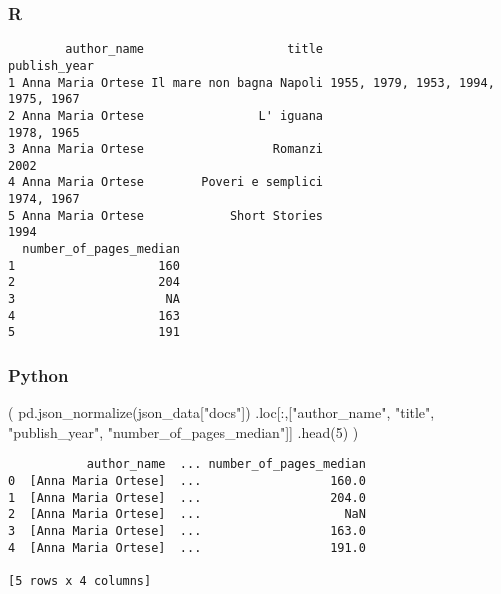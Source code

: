 \documentclass[
  letterpaper,
  DIV=11,
  numbers=noendperiod]{scrreprt}
\newenvironment{Shaded}{\begin{snugshade}}{\end{snugshade}}
\newcommand{\DecValTok}[1]{\textcolor[rgb]{0.68,0.00,0.00}{#1}}
\newcommand{\FunctionTok}[1]{\textcolor[rgb]{0.28,0.35,0.67}{#1}}
\newcommand{\NormalTok}[1]{\textcolor[rgb]{0.00,0.46,0.62}{#1}}
\newcommand{\SpecialCharTok}[1]{\textcolor[rgb]{0.37,0.37,0.37}{#1}}
\newcommand{\StringTok}[1]{\textcolor[rgb]{0.13,0.47,0.30}{#1}}
\begin{document}
\hypertarget{r-8}{%
\subsubsection{R}\label{r-8}}

\begin{Shaded}
\end{Shaded}

\begin{verbatim}
        author_name                    title                       publish_year
1 Anna Maria Ortese Il mare non bagna Napoli 1955, 1979, 1953, 1994, 1975, 1967
2 Anna Maria Ortese                L' iguana                         1978, 1965
3 Anna Maria Ortese                  Romanzi                               2002
4 Anna Maria Ortese        Poveri e semplici                         1974, 1967
5 Anna Maria Ortese            Short Stories                               1994
  number_of_pages_median
1                    160
2                    204
3                     NA
4                    163
5                    191
\end{verbatim}

\hypertarget{python-8}{%
\subsubsection{Python}\label{python-8}}

\begin{Shaded}
\begin{Highlighting}[]
\NormalTok{(}
\NormalTok{    pd.json\_normalize(json\_data[}\StringTok{"docs"}\NormalTok{])}
\NormalTok{    .loc[:,[}\StringTok{"author\_name"}\NormalTok{, }\StringTok{"title"}\NormalTok{, }\StringTok{"publish\_year"}\NormalTok{, }\StringTok{"number\_of\_pages\_median"}\NormalTok{]]}
\NormalTok{    .head(}\DecValTok{5}\NormalTok{)}
\NormalTok{)}
\end{Highlighting}
\end{Shaded}

\begin{verbatim}
           author_name  ... number_of_pages_median
0  [Anna Maria Ortese]  ...                  160.0
1  [Anna Maria Ortese]  ...                  204.0
2  [Anna Maria Ortese]  ...                    NaN
3  [Anna Maria Ortese]  ...                  163.0
4  [Anna Maria Ortese]  ...                  191.0

[5 rows x 4 columns]
\end{verbatim}
\end{document}
